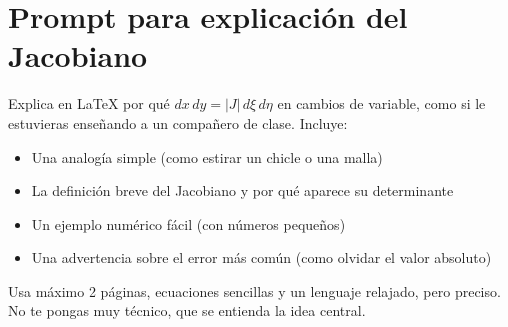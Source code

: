 \documentclass{article}
\begin{document}
\section*{Prompt para explicación del Jacobiano}

Explica en LaTeX por qué $dx\,dy = |J|\,d\xi\,d\eta$ en cambios de variable, como si le estuvieras enseñando a un compañero de clase. Incluye:

\begin{itemize}
    \item Una analogía simple (como estirar un chicle o una malla)
    \item La definición breve del Jacobiano y por qué aparece su determinante
    \item Un ejemplo numérico fácil (con números pequeños)
    \item Una advertencia sobre el error más común (como olvidar el valor absoluto)
\end{itemize}

Usa máximo 2 páginas, ecuaciones sencillas y un lenguaje relajado, pero preciso. No te pongas muy técnico, que se entienda la idea central.
\end{document}
